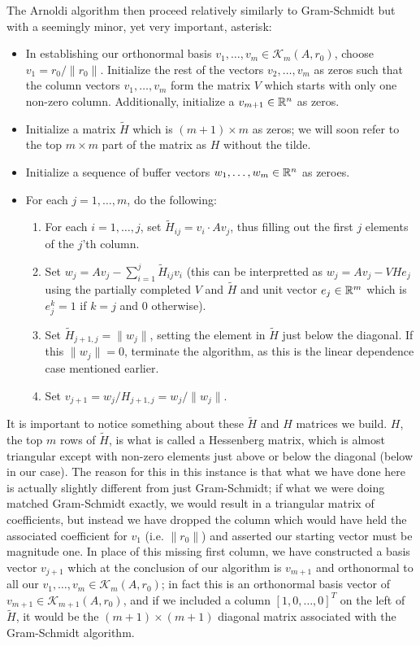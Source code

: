 \documentclass[11pt]{article}
\begin{document}
The Arnoldi algorithm then proceed relatively similarly to Gram-Schmidt but with a seemingly minor, yet very important, asterisk: \begin{itemize}
\item In establishing our orthonormal basis $v_1, \dots, v_m \in \mathcal K_m (A, r_0)$, choose $v_1 = r_0 / \lVert r_0 \rVert$. Initialize the rest of the vectors $v_2, \dots, v_m$ as zeros such that the column vectors $v_1,\dots, v_m$ form the matrix $V$ which starts with only one non-zero column. Additionally, initialize a $v_{m+1} \in \mathbb{R}^{n}$ as zeros.
\item Initialize a matrix $\tilde H$ which is $(m+1) \times m$ as zeros; we will soon refer to the top $m \times m$ part of the matrix as $H$ without the tilde. 
\item Initialize a sequence of buffer vectors $w_1, \dots, w_m \in \mathbb{R}^n$ as zeroes.
\item For each $j = 1, \dots, m$, do the following: \begin{enumerate}
\item For each $i = 1, \dots, j$, set $\tilde H_{ij} = v_i \cdot A v_j$, thus filling out the first $j$ elements of the $j$'th column.
\item Set $w_j = A v_j - \sum_{i=1}^j \tilde H_{ij} v_i$ (this can be interpretted as $w_j = Av_j - V H e_j $ using the partially completed $V$ and $\tilde H$ and unit vector $e_j \in \mathbb{R}^m$ which is $e_j^k = 1$ if $k=j$ and $0$ otherwise).
\item Set $\tilde H_{j+1,j} = \lVert w_j \rVert$, setting the element in $\tilde H$ just below the diagonal. If this $\lVert w_j \rVert = 0$, terminate the algorithm, as this is the linear dependence case mentioned earlier.
\item Set $v_{j+1} = w_j / H_{j+1, j} = w_j / \lVert w_j \rVert$.
\end{enumerate}
\end{itemize}
It is important to notice something about these $\tilde H$ and $H$ matrices we build. $H$, the top $m$ rows of $\tilde H$, is what is called a Hessenberg matrix, which is almost triangular except with non-zero elements just above or below the diagonal (below in our case). The reason for this in this instance is that what we have done here is actually slightly different from just Gram-Schmidt; if what we were doing matched Gram-Schmidt exactly, we would result in a triangular matrix of coefficients, but instead we have dropped the column which would have held the associated coefficient for $v_1$ (i.e. $\lVert r_0 \rVert$) and asserted our starting vector must be magnitude one. In place of this missing first column, we have constructed a basis vector $v_{j+1}$ which at the conclusion of our algorithm is $v_{m+1}$ and orthonormal to all our $v_1, \dots, v_m \in \mathcal{K}_m (A, r_0)$; in fact this is an orthonormal basis vector of $v_{m+1} \in \mathcal K_{m+1}(A,r_0)$, and if we included a column $[1,0,\dots,0]^T$ on the left of $\tilde H$, it would be the $(m+ 1) \times (m+1)$ diagonal matrix associated with the Gram-Schmidt algorithm.
\end{document}
